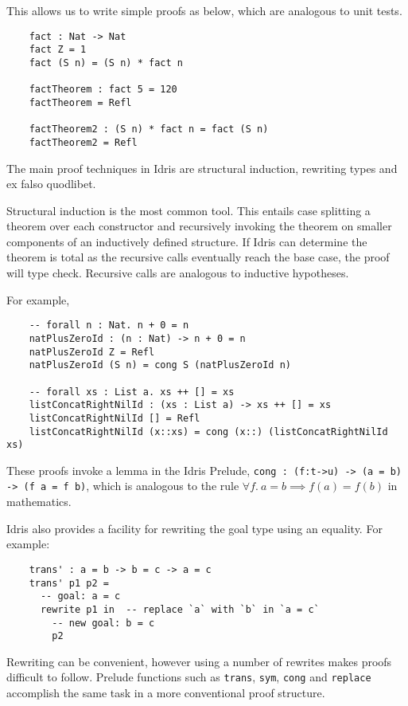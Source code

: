 \documentclass[]{report}
\begin{document}
This allows us to write simple proofs as below, which are analogous to unit tests.

\begin{verbatim}
	fact : Nat -> Nat
	fact Z = 1
	fact (S n) = (S n) * fact n
	
	factTheorem : fact 5 = 120
	factTheorem = Refl
	
	factTheorem2 : (S n) * fact n = fact (S n)
	factTheorem2 = Refl
\end{verbatim}

The main proof techniques in Idris are structural induction, rewriting types and ex falso quodlibet.

Structural induction is the most common tool. This entails case splitting a theorem over each constructor and recursively invoking the theorem on smaller components of an inductively defined structure. If Idris can determine the theorem is total as the recursive calls eventually reach the base case, the proof will type check. Recursive calls are analogous to inductive hypotheses.

For example,

\begin{verbatim}
	-- forall n : Nat. n + 0 = n
	natPlusZeroId : (n : Nat) -> n + 0 = n
	natPlusZeroId Z = Refl
	natPlusZeroId (S n) = cong S (natPlusZeroId n)
	
	-- forall xs : List a. xs ++ [] = xs
	listConcatRightNilId : (xs : List a) -> xs ++ [] = xs
	listConcatRightNilId [] = Refl
	listConcatRightNilId (x::xs) = cong (x::) (listConcatRightNilId xs)
\end{verbatim}

These proofs invoke a lemma in the Idris Prelude, \texttt{cong :\ (f:t->u) -> (a = b) -> (f a = f b)}, which is analogous to the rule $\forall f.~a=b\!\!\implies\!\! f(a)=f(b)$ in mathematics.

Idris also provides a facility for rewriting the goal type using an equality. For example:

\begin{verbatim}
	trans' : a = b -> b = c -> a = c
	trans' p1 p2 =
	  -- goal: a = c
	  rewrite p1 in  -- replace `a` with `b` in `a = c`
	    -- new goal: b = c
	    p2
\end{verbatim}

Rewriting can be convenient, however using a number of rewrites makes proofs difficult to follow. Prelude functions such as \texttt{trans}, \texttt{sym}, \texttt{cong} and \texttt{replace} accomplish the same task in a more conventional proof structure.
\end{document}
